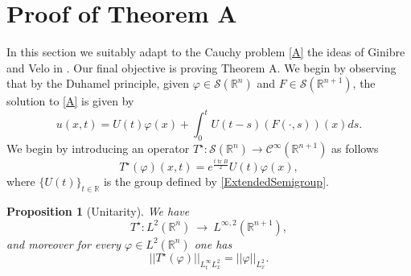 \documentclass[11pt,letter]{amsart}
\def \R {\mathbb{R}}
\def \vf{\varphi}
\def \So {\mathscr{S}(\Rn)}
\newcommand{\Rn}{\mathbb R^n}
\numberwithin{equation}{section}
\newcommand{\tr}{\operatorname{tr}}
\newtheorem{proposition}[theorem]{Proposition}
\numberwithin{equation}{section}
\begin{document}
\vskip 0.2in








\medskip









\section{Proof of Theorem A}\label{S:T}

In this section we suitably adapt to the Cauchy problem \eqref{A} the ideas of Ginibre and Velo in \cite{GV, GVstrich}. Our final objective is proving Theorem A. We begin by observing that by the Duhamel principle, given $\vf\in \So$ and $F\in \mathscr S(\R^{n+1})$, the solution to \eqref{A} is given by 
\begin{equation}\label{duhamel}
u(x,t) = U(t)\vf(x) + \int_0^t U(t-s)(F(\cdot,s))(x) ds.
\end{equation}
We begin by introducing an operator $T^\star :\So\longrightarrow \mathscr C^\infty(\R^{n+1})$ as follows
\begin{equation}\label{Tstar}
T^\star(\vf)(x,t) = e^{\frac{t \tr B}2} U(t)\vf(x),
\end{equation}
where $\{U(t)\}_{t\in \R}$ is the group defined by \eqref{ExtendedSemigroup}.

\begin{proposition}[Unitarity]\label{P:Tstar}
We have
\[
T^\star: L^2(\Rn)\ \longrightarrow\ L^{\infty,2}(\R^{n+1}),
\]
and moreover for every $\vf\in L^2(\Rn)$ one has
\begin{equation}\label{Tstaruno}
||T^\star(\vf)||_{L^\infty_t L^2_x} = ||\vf||_{L^2_x}.
\end{equation}
\end{proposition}
\end{document}
